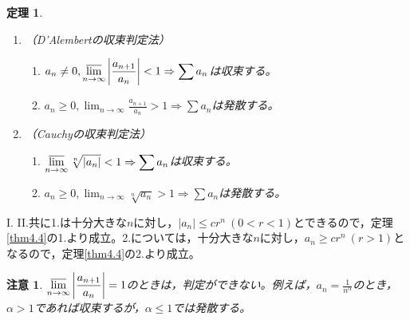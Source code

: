 \documentclass[dvipdfmx,a4j,10pt]{jsarticle}
\makeatletter
\theoremstyle{mystyle1}
\newtheorem{thm}[dfn]{定理}
\theoremstyle{mystyle2}
\newtheorem{note}{注意}
\renewenvironment{proof}[1][\proofname]{\par
  \pushQED{\qed}%
  \normalfont
  \topsep6\p@\@plus6\p@ \trivlist
  \item[\hskip\labelsep{\bfseries\sffamily #1}]\ignorespaces
}{%
  \popQED\endtrivlist\@endpefalse
}
\renewcommand\proofname{証明}
\makeatother
\begin{document}
\begin{framed}
    \begin{thm}\label{thm4.5}
        \begin{enumerate}
        \renewcommand{\labelenumi}{\Roman{enumi}.}
        \item （D'Alembertの収束判定法）
            \begin{enumerate}
                \renewcommand{\labelenumii}{\arabic{enumii}.}
                \item $\displaystyle a_n\neq0,\varlimsup_{n\to\infty}\left|\frac{a_{n+1}}{a_n}\right|<1\Rightarrow \displaystyle\sum a_n$は収束する。
                \item $\displaystyle a_n\geq0,\lim_{n\to\infty}\frac{a_{n+1}}{a_n}>1\Rightarrow \displaystyle\sum a_n$は発散する。
            \end{enumerate}
        \item （Cauchyの収束判定法）
            \begin{enumerate}
                \renewcommand{\labelenumii}{\arabic{enumii}.}
                \item $\displaystyle\varlimsup_{n\to\infty}\sqrt[n]{|a_n|}<1\Rightarrow \displaystyle\sum a_n$は収束する。
                \item $\displaystyle a_n\geq0,\lim_{n\to\infty}\sqrt[n]{a_n}>1\Rightarrow \displaystyle\sum a_n$は発散する。
            \end{enumerate}
        \end{enumerate}
    \end{thm}
\end{framed}

\begin{proof}[定理\ref{thm4.5}の証明]
    I. II.共に1.は十分大きな$n$に対し，$|a_n|\leq cr^n\ (0<r<1)$とできる\footnotemark  ので，定理\ref{thm4.4}の1.より成立。2.については，十分大きな$n$に対し，$a_n\geq cr^n\ (r>1)$となるので，定理\ref{thm4.4}の2.より成立。
\end{proof}

\begin{note}
    $\displaystyle\varlimsup_{n\to\infty}\left|\frac{a_{n+1}}{a_n}\right|=1$のときは，判定ができない。例えば，$\displaystyle a_n=\frac{1}{n^\alpha}$のとき，$\alpha>1$であれば収束するが，$\alpha\leq 1$では発散する。
\end{note}

\end{document}
